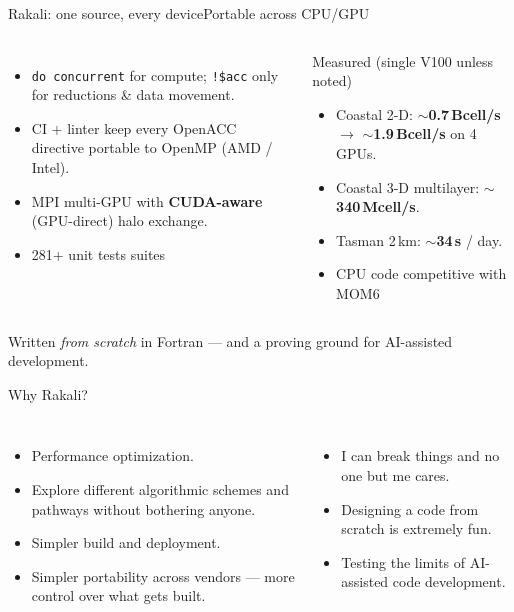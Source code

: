 \documentclass[aspectratio=169]{beamer}
\newcommand{\cplx}[1]{{\footnotesize\color{cookieMuted}#1}}
\begin{document}
\begin{frame}{Rakali: one source, every device}{Portable across CPU/GPU}
  \begin{columns}[T,onlytextwidth]
      \begin{itemize}
        \item \texttt{do concurrent} for compute; \texttt{!\$acc} only for reductions \& data movement.
        \item CI + linter keep every OpenACC directive portable to OpenMP (AMD / Intel).
        \item MPI multi-GPU with \textbf{CUDA-aware} (GPU-direct) halo exchange.
        \item 281+ unit tests suites 
      \end{itemize}
      \begin{block}{Measured \cplx{(single V100 unless noted)}}
        \footnotesize
        \begin{itemize}\setlength\itemsep{1pt}
          \item Coastal 2-D: \textbf{$\sim$0.7\,Bcell/s} $\to$ \textbf{$\sim$1.9\,Bcell/s} on 4 GPUs.
          \item Coastal 3-D multilayer: \textbf{$\sim$340\,Mcell/s}.
          \item Tasman 2\,km: \textbf{$\sim$34\,s} / day.
          \item CPU code competitive with MOM6
        \end{itemize}
      \end{block}
  \end{columns}
  \vspace{.2em}
  \centering\footnotesize Written \emph{from scratch} in Fortran --- and a proving ground for AI-assisted development.
\end{frame}

\begin{frame}{Why Rakali?}
  \begin{columns}[T,onlytextwidth]
      \begin{itemize}
        \item Performance optimization.
        \item Explore different algorithmic schemes and pathways without bothering anyone.
        \item Simpler build and deployment.
        \item Simpler portability across vendors --- more control over what gets built.
      \end{itemize}
      \begin{itemize}
        \item I can break things and no one but me cares.
        \item Designing a code from scratch is extremely fun.
        \item Testing the limits of AI-assisted code development.
      \end{itemize}
  \end{columns}
\end{frame}
\end{document}
